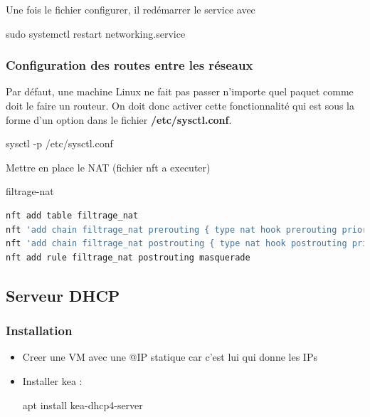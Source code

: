 \documentclass{article}
\begin{document}
Une fois le fichier configurer, il redémarrer le service avec 
\begin{command}
sudo systemctl restart networking.service
\end{command}
\subsubsection{Configuration des routes entre les réseaux}

Par défaut, une machine Linux ne fait pas passer n'importe quel paquet comme doit le faire un routeur. On doit donc activer cette fonctionnalité qui est sous la forme d'un option dans le fichier \textbf{/etc/sysctl.conf}.


\begin{command}
    sysctl -p /etc/sysctl.conf
\end{command}

Mettre en place le NAT (fichier nft a executer) 
\begin{codebox}{filtrage-nat}
\begin{lstlisting}[language=Bash]
nft add table filtrage_nat
nft 'add chain filtrage_nat prerouting { type nat hook prerouting priority 0 ; }'
nft 'add chain filtrage_nat postrouting { type nat hook postrouting priority 0 ; }'
nft add rule filtrage_nat postrouting masquerade
\end{lstlisting}
\end{codebox}

\subsection{Serveur DHCP}

\subsubsection{Installation}
\begin{itemize}
    \item Creer une VM avec une @IP statique car c’est lui qui donne les IPs
    \item Installer kea : \begin{rootcommand} apt install kea-dhcp4-server \end{rootcommand}
\end{itemize}
\end{document}
